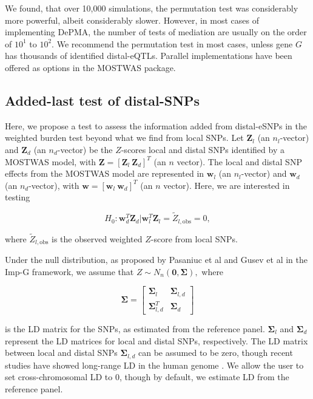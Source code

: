 \documentclass[11pt]{article}
\begin{document}
We found, that over 10,000 simulations, the permutation test
was considerably more powerful, albeit considerably slower.
However, in most cases of implementing 
DePMA,
the number of tests of mediation are usually on
the order of $10^1$ to $10^2$. We recommend the permutation
test in most cases, unless gene $G$ has thousands
of identified distal-eQTLs.
Parallel implementations have
been offered as options in the MOSTWAS
package.

\pagebreak

\subsection{Added-last test of distal-SNPs}

Here, we propose a test to assess
the information added from distal-eSNPs
in the weighted burden test beyond
what we find from local SNPs.
Let $\mathbf{Z}_l$ (an $n_l$-vector) and 
$\mathbf{Z}_d$ (an $n_d$-vector) be the $Z$-scores
local and distal SNPs identified
by a MOSTWAS model, with
$\mathbf{Z} = [\mathbf{Z}_l~\mathbf{Z}_d]^T$ 
(an $n$ vector). The local
and distal SNP effects
from the MOSTWAS model are represented
in $\mathbf{w}_l$ (an $n_l$-vector) and 
$\mathbf{w}_d$ 
(an $n_d$-vector),
with $\mathbf{w} = [\mathbf{w}_l~\mathbf{w}_d]^T$ 
(an $n$ vector). Here, we are
interested in testing

$$H_0: \mathbf{w}_d^T\mathbf{Z}_d | \mathbf{w}_l^T\mathbf{Z}_l = \tilde{Z}_{l,\text{obs}} = 0,$$

where $\tilde{Z}_{l,\text{obs}}$
is the observed weighted $Z$-score
from local SNPs.

Under the null distribution, as
proposed by Pasaniuc et al and Gusev et al
in the Imp-G 
framework\cite{Pasaniuc2014FastEnrichment,Gusev2016},
we assume that $Z \sim N_n\left(\mathbf{0},\mathbf{\Sigma}\right),$
where

$$\mathbf{\Sigma} = \begin{bmatrix}
\mathbf{\Sigma}_{l} & \mathbf{\Sigma}_{l,d} \\
\mathbf{\Sigma}_{l,d}^T & \mathbf{\Sigma}_{d}
\end{bmatrix}$$

is the LD matrix for the SNPs, as estimated
from the reference panel. $\mathbf{\Sigma}_{l}$
and $\mathbf{\Sigma}_{d}$ represent
the LD matrices for local and distal SNPs,
respectively. The LD matrix
between local and distal SNPs $\mathbf{\Sigma}_{l,d}$
can be assumed to be zero, though
recent studies have showed long-range
LD in the human genome
\cite{Koch2013LongGenome,Park2019Population-specificVariants}.
We allow the user to set cross-chromosomal
LD to 0, though by default,
we estimate LD from the reference panel.
\end{document}
